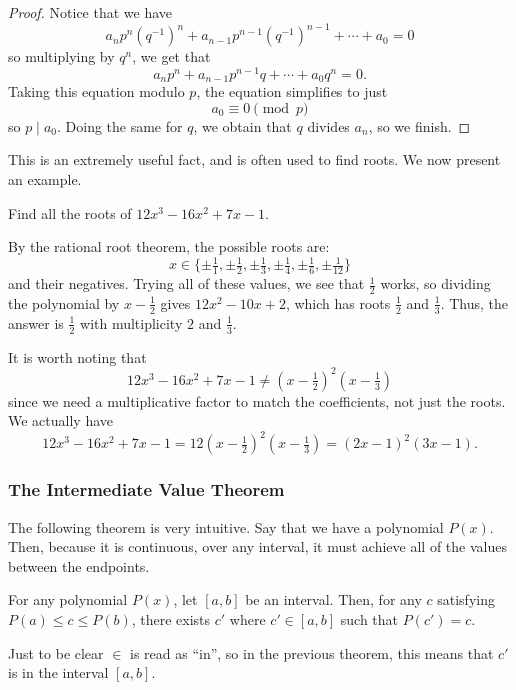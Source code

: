 \documentclass[11pt]{scrartcl}
\begin{document}
\begin{proof}
Notice that we have \[a_np^n\left(q^{-1}\right)^n+a_{n-1}p^{n-1}\left(q^{-1}\right)^{n-1}+\cdots+a_0 = 0\] so multiplying by $q^n$, we get that \[a_np^n+a_{n-1}p^{n-1}q+\cdots+a_0q^n = 0.\] Taking this equation modulo $p$, the equation simplifies to just \[a_0 \equiv 0 \pmod{p}\] so $p \mid a_0$. Doing the same for $q$, we obtain that $q$ divides $a_n$, so we finish.
\end{proof}

This is an extremely useful fact, and is often used to find roots. We now present an example.

\begin{example*}
Find all the roots of $12x^3 - 16x^2 + 7x - 1$.
\end{example*}

By the rational root theorem, the possible roots are: \[x \in \{\pm\tfrac{1}{1}, \pm\tfrac{1}{2}, \pm\tfrac{1}{3}, \pm\tfrac{1}{4}, \pm\tfrac{1}{6}, \pm\tfrac{1}{12}\}\] and their negatives. Trying all of these values, we see that $\tfrac{1}{2}$ works, so dividing the polynomial by $x-\tfrac{1}{2}$ gives $12 x^2 - 10 x + 2$, which has roots $\tfrac{1}{2}$ and $\tfrac{1}{3}$. Thus, the answer is $\tfrac{1}{2}$ with multiplicity $2$ and $\tfrac{1}{3}$.

It is worth noting that \[12x^3-16x^2+7x-1 \neq \left(x-\tfrac{1}{2}\right)^2\left(x-\tfrac{1}{3}\right)\] since we need a multiplicative factor to match the coefficients, not just the roots. We actually have \[12x^3-16x^2+7x-1 = 12\left(x-\tfrac{1}{2}\right)^2\left(x-\tfrac{1}{3}\right) = (2x-1)^2(3x-1).\]

\subsubsection{The Intermediate Value Theorem}

The following theorem is very intuitive. Say that we have a polynomial $P(x)$. Then, because it is continuous, over any interval, it must achieve all of the values between the endpoints.

\begin{theorem*}
For any polynomial $P(x)$, let $[a, b]$ be an interval. Then, for any $c$ satisfying $P(a) \le c \le P(b)$, there exists $c'$ where $c' \in [a, b]$ such that $P(c') = c$.
\end{theorem*}

Just to be clear $\in$ is read as ``in'', so in the previous theorem, this means that $c'$ is in the interval $[a, b]$.
\end{document}
